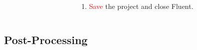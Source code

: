 \documentclass[10pt,compress, unknownkeysallowed]{beamer}
\newcommand{\red}{\textcolor{red}}
\begin{document}
\begin{frame}
\begin{columns}
\begin{column}[l]{0.5\linewidth}
        \end{column}
           \begin{column}[l]{0.5\linewidth}
           \begin{enumerate}\scriptsize\setcounter{enumi}{6}
                \item<5-> \red{Save} the project and close Fluent.
           \end{enumerate}
           \end{column}
    \end{columns}
\end{frame}

\subsection{Post-Processing}
\end{document}
